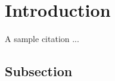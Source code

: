 \section{Introduction}\label{sec::introduction}
A sample citation ... \cite{Bloom1970Space/Timea}
\subsection{Subsection}
